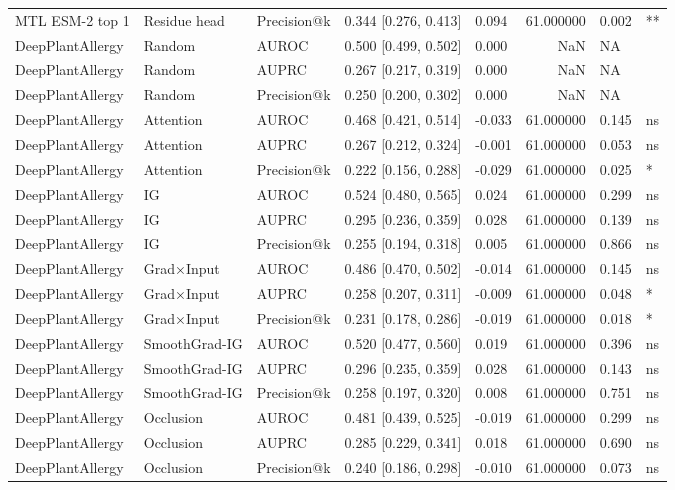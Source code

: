 \begin{tabular}{lllllrll}
MTL ESM-2 top 1 & Residue head & Precision@k & 0.344 [0.276, 0.413] & 0.094 & 61.000000 & 0.002 & ** \\
DeepPlantAllergy & Random & AUROC & 0.500 [0.499, 0.502] & 0.000 & NaN & NA &  \\
DeepPlantAllergy & Random & AUPRC & 0.267 [0.217, 0.319] & 0.000 & NaN & NA &  \\
DeepPlantAllergy & Random & Precision@k & 0.250 [0.200, 0.302] & 0.000 & NaN & NA &  \\
DeepPlantAllergy & Attention & AUROC & 0.468 [0.421, 0.514] & -0.033 & 61.000000 & 0.145 & ns \\
DeepPlantAllergy & Attention & AUPRC & 0.267 [0.212, 0.324] & -0.001 & 61.000000 & 0.053 & ns \\
DeepPlantAllergy & Attention & Precision@k & 0.222 [0.156, 0.288] & -0.029 & 61.000000 & 0.025 & * \\
DeepPlantAllergy & IG & AUROC & 0.524 [0.480, 0.565] & 0.024 & 61.000000 & 0.299 & ns \\
DeepPlantAllergy & IG & AUPRC & 0.295 [0.236, 0.359] & 0.028 & 61.000000 & 0.139 & ns \\
DeepPlantAllergy & IG & Precision@k & 0.255 [0.194, 0.318] & 0.005 & 61.000000 & 0.866 & ns \\
DeepPlantAllergy & Grad×Input & AUROC & 0.486 [0.470, 0.502] & -0.014 & 61.000000 & 0.145 & ns \\
DeepPlantAllergy & Grad×Input & AUPRC & 0.258 [0.207, 0.311] & -0.009 & 61.000000 & 0.048 & * \\
DeepPlantAllergy & Grad×Input & Precision@k & 0.231 [0.178, 0.286] & -0.019 & 61.000000 & 0.018 & * \\
DeepPlantAllergy & SmoothGrad-IG & AUROC & 0.520 [0.477, 0.560] & 0.019 & 61.000000 & 0.396 & ns \\
DeepPlantAllergy & SmoothGrad-IG & AUPRC & 0.296 [0.235, 0.359] & 0.028 & 61.000000 & 0.143 & ns \\
DeepPlantAllergy & SmoothGrad-IG & Precision@k & 0.258 [0.197, 0.320] & 0.008 & 61.000000 & 0.751 & ns \\
DeepPlantAllergy & Occlusion & AUROC & 0.481 [0.439, 0.525] & -0.019 & 61.000000 & 0.299 & ns \\
DeepPlantAllergy & Occlusion & AUPRC & 0.285 [0.229, 0.341] & 0.018 & 61.000000 & 0.690 & ns \\
DeepPlantAllergy & Occlusion & Precision@k & 0.240 [0.186, 0.298] & -0.010 & 61.000000 & 0.073 & ns \\
\bottomrule
\end{tabular}
